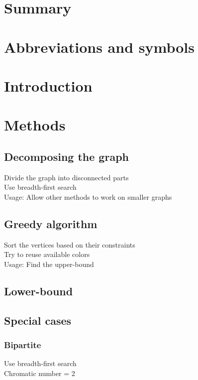 \documentclass[a4paper]{report}
\begin{document}
	

	\chapter*{Summary}
	
	\tableofcontents
	
	\chapter*{Abbreviations and symbols}
	
	\chapter{Introduction}

	
	\chapter{Methods}
		\section{Decomposing the graph}
		Divide the graph into disconnected parts\\
		Use breadth-first search\\
		Usage: Allow other methods to work on smaller graphs
		
		\section{Greedy algorithm}
		Sort the vertices based on their constraints\\
		Try to reuse available colors\\
		Usage: Find the upper-bound
		
		\section{Lower-bound}
		
		\section{Special cases}
			\subsection{Bipartite}
			Use breadth-first search\\
			Chromatic number = 2
\end{document}
